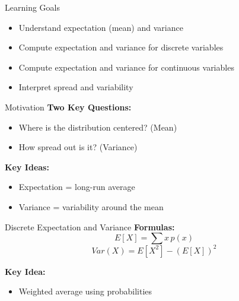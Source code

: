 \documentclass[dvipsnames]{beamer}
\begin{document}



\begin{frame}{Learning Goals}
\begin{itemize}
    \item Understand expectation (mean) and variance
    \item Compute expectation and variance for discrete variables
    \item Compute expectation and variance for continuous variables
    \item Interpret spread and variability
\end{itemize}
\end{frame}


\begin{frame}{Motivation}
\textbf{Two Key Questions:}
\begin{itemize}
    \item Where is the distribution centered? (Mean)
    \item How spread out is it? (Variance)
\end{itemize}

\textbf{Key Ideas:}
\begin{itemize}
    \item Expectation = long-run average
    \item Variance = variability around the mean
\end{itemize}
\end{frame}


\begin{frame}{Discrete Expectation and Variance}
\textbf{Formulas:}
\[
E[X] = \sum x\,p(x)
\]
\[
Var(X) = E[X^2] - (E[X])^2
\]

\textbf{Key Idea:}
\begin{itemize}
    \item Weighted average using probabilities
\end{itemize}
\end{frame}

\end{document}
